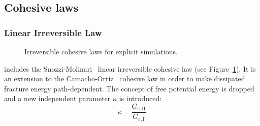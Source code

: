 \subsection{Cohesive laws}
\label{sec:cohesive-laws}

\subsubsection{Linear Irreversible Law}

\begin{figure}[!hbt]
  \centering
  \qquad
  \caption{Irreversible cohesive laws for explicit simulations.}
  \label{fig:smm:coh:linear_cohesive_law}
\end{figure}

\akantu includes the Snozzi-Molinari~\cite{snozzi_cohesive_2013}
linear irreversible cohesive law (see
Figure~\ref{fig:smm:coh:linear_cohesive_law}). It is an extension to
the Camacho-Ortiz~\cite{camacho_computational_1996} cohesive law in
order to make dissipated fracture energy path-dependent. The concept
of free potential energy is dropped and a new independent parameter
$\kappa$ is introduced:
\begin{equation}
  \kappa = \frac{G_\mathrm{c, II}}{G_\mathrm{c, I}}
\end{equation}


